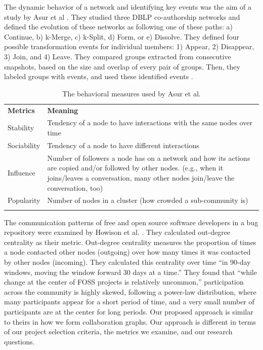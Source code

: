 \documentclass[12pt]{report}
\begin{document}
The dynamic behavior of a network and identifying key events was the aim of a study by Asur et al \cite{Asur}. They studied three DBLP co-authorship networks and defined the evolution of these networks as following one of these paths: a) Continue, b) k-Merge, c) k-Split, d) Form, or e) Dissolve. They defined four possible transformation events for individual members: 1) Appear, 2) Disappear, 3) Join, and 4) Leave. They compared groups extracted from consecutive snapshots, based on the size and overlap of every pair of groups. Then, they labeled groups with events, and used these identified events \cite{Asur}.

\begin{table}[!htbp]
\caption{The behavioral measures used by Asur et al. \cite{Asur}}
\label{tableDiversityMeasuresAsurEtAl} 
\begin{tabular}{p{} p{}}
\hline\noalign{\smallskip}
\textbf{Metrics} & \textbf{Meaning} \\
\noalign{\smallskip}\hline\noalign{\smallskip}
Stability & Tendency of a node to have interactions with the same nodes over time \\ \hline
Sociability & Tendency of a node to have different interactions \\\hline
Influence & Number of followers a node has on a network and how its actions are copied and/or followed by other nodes. (e.g., when it joins/leaves a conversation, many other nodes join/leave the conversation, too) \\\hline
Popularity & Number of nodes in a cluster (how crowded a sub-community is) \\
\noalign{\smallskip}\hline
\end{tabular}
\end{table}

The communication patterns of free and open source software developers in a bug repository were examined by Howison et al. \cite{HowisonSocialDynamics}. They calculated out-degree centrality as their metric. Out-degree centrality measures the proportion of times a node contacted other nodes (outgoing) over how many times it was contacted by other nodes (incoming). They calculated this centrality over time ``in 90-day windows, moving the window forward 30 days at a time.'' They found that ``while change at the center of FOSS projects is relatively uncommon,'' participation across the community is highly skewed, following a power-law distribution, where many participants appear for a short period of time, and a very small number of participants are at the center for long periods. Our proposed approach is similar to theirs in how we form collaboration graphs. Our approach is different in terms of our project selection criteria, the metrics we examine, and our research questions.
\end{document}
